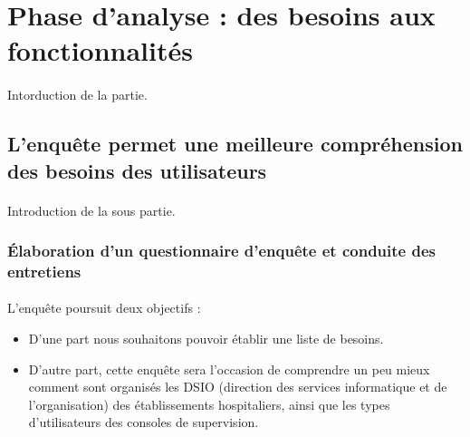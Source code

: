 \newpage
\section{Phase d'analyse : des besoins aux fonctionnalités}
	\paragraph{}
	Intorduction de la partie.
	
	\subsection{L'enquête permet une meilleure compréhension des besoins des utilisateurs}
		\paragraph{}
		Introduction de la sous partie.
		
		\subsubsection{Élaboration d'un questionnaire d'enquête et conduite des entretiens}
			\paragraph{}%
			L'enquête poursuit deux objectifs :
			\begin{itemize}
			  \item D’une part nous souhaitons pouvoir établir une liste de besoins.
			  \item D’autre part, cette enquête sera l’occasion de comprendre un peu
			  mieux comment sont organisés les DSIO (direction des services informatique
			  et de l’organisation) des établissements hospitaliers, ainsi que les types
			  d’utilisateurs des consoles de supervision.
			\end{itemize}
			
